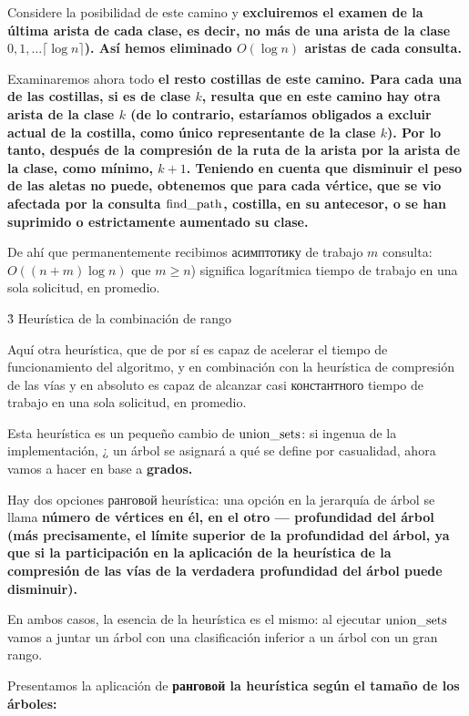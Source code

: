 Considere la posibilidad de este camino y \bf{excluiremos} el examen de la última arista de cada clase, es decir, no más de una arista de la clase $0, 1, \ldots \lceil \log n \rceil$). Así hemos eliminado $O(\log n)$ aristas de cada consulta.

Examinaremos ahora todo \bf{el resto} costillas de este camino. Para cada una de las costillas, si es de clase $k$, resulta que en este camino hay otra arista de la clase $k$ (de lo contrario, estaríamos obligados a excluir actual de la costilla, como único representante de la clase $k$). Por lo tanto, después de la compresión de la ruta de la arista por la arista de la clase, como mínimo, $k+1$. Teniendo en cuenta que disminuir el peso de las aletas no puede, obtenemos que para cada vértice, que se vio afectada por la consulta $\rm find\_path$, costilla, en su antecesor, o se han suprimido o estrictamente aumentado su clase.

De ahí que permanentemente recibimos асимптотику de trabajo $m$ consulta: $O((n+m) \log n)$ que $m \ge n$) significa logarítmica tiempo de trabajo en una sola solicitud, en promedio.



\h3{ Heurística de la combinación de rango }

Aquí otra heurística, que de por sí es capaz de acelerar el tiempo de funcionamiento del algoritmo, y en combinación con la heurística de compresión de las vías y en absoluto es capaz de alcanzar casi константного tiempo de trabajo en una sola solicitud, en promedio.

Esta heurística es un pequeño cambio de ${\rm union\_sets}$: si ingenua de la implementación, ¿ un árbol se asignará a qué se define por casualidad, ahora vamos a hacer en base a \bf{grados}.

Hay dos opciones ранговой heurística: una opción en la jerarquía de árbol se llama \bf{número de vértices} en él, en el otro --- \bf{profundidad del árbol} (más precisamente, el límite superior de la profundidad del árbol, ya que si la participación en la aplicación de la heurística de la compresión de las vías de la verdadera profundidad del árbol puede disminuir).

En ambos casos, la esencia de la heurística es el mismo: al ejecutar $\rm union\_sets$ vamos a juntar un árbol con una clasificación inferior a un árbol con un gran rango.

Presentamos la aplicación de \bf{ранговой la heurística según el tamaño de los árboles}:

